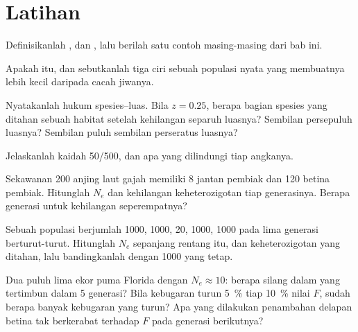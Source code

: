 \section{Latihan}

\begin{exercise}[$\star$]\label{exo:b3:conservation-biology:1}
Definisikanlah ,  dan , lalu berilah satu contoh masing-masing dari bab ini.
\end{exercise}

\begin{exercise}[$\star$]\label{exo:b3:conservation-biology:2}
Apakah  itu, dan sebutkanlah tiga ciri sebuah
populasi nyata yang membuatnya lebih kecil daripada cacah jiwanya.
\end{exercise}

\begin{exercise}[$\star$]\label{exo:b3:conservation-biology:3}
Nyatakanlah hukum spesies--luas. Bila $z = 0.25$, berapa bagian spesies
yang ditahan sebuah habitat setelah kehilangan separuh luasnya? Sembilan
persepuluh luasnya? Sembilan puluh sembilan perseratus luasnya?
\end{exercise}

\begin{exercise}[$\star$]\label{exo:b3:conservation-biology:4}
Jelaskanlah kaidah 50/500, dan apa yang dilindungi tiap angkanya.
\end{exercise}

\begin{exercise}[$\star\star$]\label{exo:b3:conservation-biology:5}
Sekawanan 200 anjing laut gajah memiliki 8 jantan pembiak dan 120 betina
pembiak. Hitunglah $N_{e}$ dan kehilangan keheterozigotan tiap
generasinya. Berapa generasi untuk kehilangan seperempatnya?
\end{exercise}

\begin{exercise}[$\star\star$]\label{exo:b3:conservation-biology:6}
Sebuah populasi berjumlah 1000, 1000, 20, 1000, 1000 pada lima generasi
berturut-turut. Hitunglah $N_{e}$ sepanjang rentang itu, dan
keheterozigotan yang ditahan, lalu bandingkanlah dengan 1000 yang tetap.
\end{exercise}

\begin{exercise}[$\star\star$]\label{exo:b3:conservation-biology:7}
Dua puluh lima ekor puma Florida dengan $N_{e} \approx 10$: berapa silang
dalam yang tertimbun dalam 5 generasi? Bila kebugaran turun \qty{5}{\%}
tiap \qty{10}{\%} nilai $F$, sudah berapa banyak kebugaran yang turun? Apa
yang dilakukan penambahan delapan betina tak berkerabat terhadap $F$ pada
generasi berikutnya?
\end{exercise}

